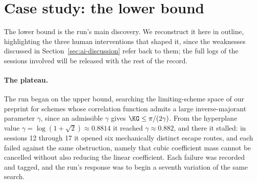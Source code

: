 \newpage
\appendix


\section{Case study: the lower bound}
\label{app:ai-case-study}

The lower bound is the run's main discovery. We reconstruct it here in
outline, highlighting the three human interventions that shaped it, since
the weaknesses discussed in Section~\ref{sec:ai-discussion} refer back to
them; the full logs of the sessions involved will be released with the rest
of the record.


\paragraph{The plateau.}
The run began on the upper bound, searching the limiting-scheme space of our
preprint for schemes whose correlation function admits a large
inverse-majorant parameter $\gamma$, since an admissible $\gamma$ gives
$\KG\le\pi/(2\gamma)$. From the hyperplane value
$\gamma=\log(1+\sqrt2)\approx0.8814$ it reached $\gamma\approx0.882$, and
there it stalled: in sessions 12 through 17 it opened six 
mechanically distinct escape routes, and each failed against the same obstruction,
namely that cubic coefficient mass cannot be cancelled without also reducing
the linear coefficient. Each failure was recorded and tagged, and the run's
response was to begin a seventh variation of the same search.

